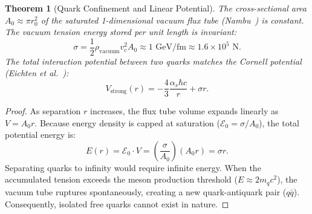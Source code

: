 \documentclass[11pt,a4paper]{article}
\newtheorem{theorem}{Theorem}[section]
\begin{document}
\begin{theorem}[Quark Confinement and Linear Potential]
    \label{thm:kuark_hapsi_p3}
    The cross-sectional area $A_0 \approx \pi r_0^2$ of the saturated 1-dimensional vacuum flux tube (Nambu~\cite{nambu1974}) is constant. The vacuum tension energy stored per unit length is invariant:
    \begin{equation}
        \sigma = \frac{1}{2} \rho_{\mathrm{vacuum}} v_c^2 A_0 \approx 1\text{ GeV/fm} \approx 1.6 \times 10^5\text{ N}.
        \label{eq:sicim_gerilimi_tr}
    \end{equation}
    The total interaction potential between two quarks matches the Cornell potential (Eichten et al.~\cite{eichten1978}):
    \begin{equation}
        V_{\mathrm{strong}}(r) = -\frac{4}{3}\frac{\alpha_s \hbar c}{r} + \sigma r.
        \label{eq:cornell_ispat}
    \end{equation}
\end{theorem}

\begin{proof}
    As separation $r$ increases, the flux tube volume expands linearly as $V = A_0 r$. Because energy density is capped at saturation ($\mathcal{E}_0 = \sigma / A_0$), the total potential energy is:
    \begin{equation}
        E(r) = \mathcal{E}_0 \cdot V = \left(\frac{\sigma}{A_0}\right) (A_0 r) = \sigma r.
    \end{equation}
    Separating quarks to infinity would require infinite energy. When the accumulated tension exceeds the meson production threshold ($E \approx 2 m_q c^2$), the vacuum tube ruptures spontaneously, creating a new quark-antiquark pair ($q\bar{q}$). Consequently, isolated free quarks cannot exist in nature.
\end{proof}
\end{document}

